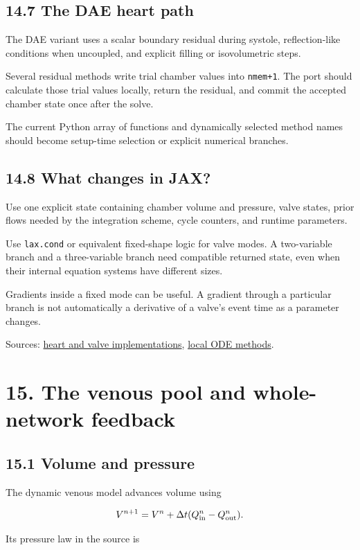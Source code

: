 \documentclass[11pt,a4paper]{article}
\begin{document}
\subsection{14.7 The DAE heart path}
The DAE variant uses a scalar boundary residual during systole, reflection-like conditions when uncoupled, and explicit filling or isovolumetric steps.

Several residual methods write trial chamber values into \texttt{nmem+1}. The port should calculate those trial values locally, return the residual, and commit the accepted chamber state once after the solve.

The current Python array of functions and dynamically selected method names should become setup-time selection or explicit numerical branches.

\subsection{14.8 What changes in JAX?}
Use one explicit state containing chamber volume and pressure, valve states, prior flows needed by the integration scheme, cycle counters, and runtime parameters.

Use \texttt{lax.\allowbreak{}cond} or equivalent fixed-shape logic for valve modes. A two-variable branch and a three-variable branch need compatible returned state, even when their internal equation systems have different sizes.

Gradients inside a fixed mode can be useful. A gradient through a particular branch is not automatically a derivative of a valve's event time as a parameter changes.

Sources: \href{/home/sadid/starfish/NetworkLib/classBoundaryConditions.py}{heart and valve implementations}, \href{/home/sadid/starfish/NetworkLib/ODESolver.py}{local ODE methods}.

\clearpage
\section{15. The venous pool and whole-network feedback}
\subsection{15.1 Volume and pressure}
The dynamic venous model advances volume using


\begingroup\small
\[
V^{n+1}=V^n+\Delta t(Q_{\rm in}^n-Q_{\rm out}^n).
\]
\endgroup


Its pressure law in the source is
\end{document}

